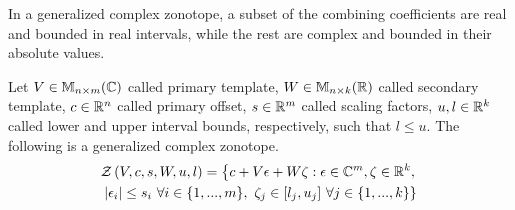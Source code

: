 In a generalized complex zonotope,
a subset of the combining coefficients are real and bounded in real
intervals, while the rest are complex and bounded in their
absolute values.

\begin{definition}
Let $V\in\mathbb{M}_{n\times m}(\mathbb{C})$ called primary template, $W\in\mathbb{M}_{n\times k}(\mathbb{R})$
called secondary template, $c\in\mathbb{R}^n$ called primary offset,
$s\in\mathbb{R}^m$ called scaling factors, $u,l\in\mathbb{R}^k$ called lower
and upper interval bounds, respectively, such that $l\leq u$.  The
following is a generalized complex
zonotope.
\begin{multline}
\mathcal{Z}\left(V,c,s,W,u,l\right) =
\left\{
  c+V\epsilon+W\zeta:\epsilon\in\mathbb{C}^m,\zeta\in\mathbb{R}^k,\right.\\ \left.  \left|\epsilon_i\right|\leq
 s_i~\forall i\in\{1,...,m\},~\zeta_j\in[l_j,u_j]~\forall j\in \{1,...,k\}
\right\}
\end{multline}
\end{definition}